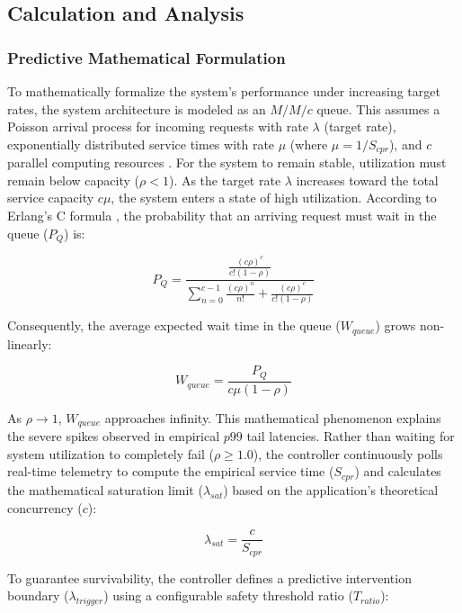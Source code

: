 \documentclass{ieeeaccess}
\begin{document}
	\subsection{Calculation and Analysis}
	\label{sec3.2}
	
	\subsubsection{Predictive Mathematical Formulation}
	To mathematically formalize the system's performance under increasing target rates, the system architecture is modeled as an $M/M/c$ queue. This assumes a Poisson arrival process for incoming requests with rate $\lambda$ (target rate), exponentially distributed service times with rate $\mu$ (where $\mu = 1 / S_{cpr}$), and $c$ parallel computing resources \cite{tijms2003first} \cite{Banerjee2023MTDDHJSMTA}. For the system to remain stable, utilization must remain below capacity ($\rho < 1$). As the target rate $\lambda$ increases toward the total service capacity $c\mu$, the system enters a state of high utilization. According to Erlang's C formula \cite{angus2001introduction}, the probability that an arriving request must wait in the queue ($P_Q$) is:
	
	\begin{equation}
		P_Q = \frac{\frac{(c\rho)^c}{c!(1-\rho)}}{\sum_{n=0}^{c-1} \frac{(c\rho)^n}{n!} + \frac{(c\rho)^c}{c!(1-\rho)}}
	\end{equation}
	
	Consequently, the average expected wait time in the queue ($W_{queue}$) grows non-linearly:
	
	\begin{equation}
		W_{queue} = \frac{P_Q}{c\mu(1-\rho)}
	\end{equation}
	
	As $\rho \to 1$, $W_{queue}$ approaches infinity. This mathematical phenomenon explains the severe spikes observed in empirical $p99$ tail latencies. Rather than waiting for system utilization to completely fail ($\rho \ge 1.0$), the controller continuously polls real-time telemetry to compute the empirical service time ($S_{cpr}$) and calculates the mathematical saturation limit ($\lambda_{sat}$) based on the application's theoretical concurrency ($c$):
	
	\begin{equation}
		\lambda_{sat} = \frac{c}{S_{cpr}}
	\end{equation}
	
	To guarantee survivability, the controller defines a predictive intervention boundary ($\lambda_{trigger}$) using a configurable safety threshold ratio ($T_{ratio}$):
	
\end{document}
